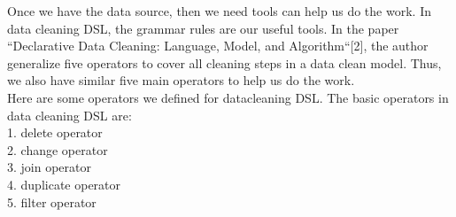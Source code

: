 \documentclass[11pt]{article}
\begin{document}
Once we have the data source, then we need tools can help us do the work. In data cleaning DSL, the grammar rules are our useful tools. In the paper ``Declarative Data Cleaning: Language, Model, and Algorithm``[2], the author generalize five operators to cover all cleaning steps in a data clean model. Thus, we also have similar five main operators to help us do the work.\\

Here are some operators we defined for datacleaning DSL. 
The basic operators in data cleaning DSL are:\\
  1. delete operator\\
  2. change operator\\
  3. join operator\\
  4. duplicate operator\\
  5. filter operator\\
\end{document}
